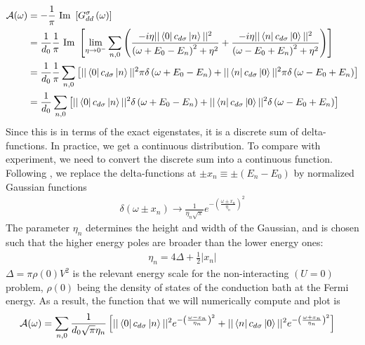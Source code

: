 \documentclass[twoside,11pt]{report}
\numberwithin{equation}{section}
\begin{document}
\begin{equation}\begin{aligned}
	\mathcal{A(\omega)} &= -\frac{1}{\pi}\text{ Im }\left[G_{dd}^\sigma\left( \omega \right) \right] \\
			    &= \frac{1}{d_0}\frac{1}{\pi}\text{ Im }\left[\lim_{\eta \to 0^-}\sum_{n,0}\left(\frac{-i\eta ||\bra{0}c_{d\sigma}\ket{n}||^2}{\left(\omega + E_0 - E_n\right)^2 + \eta^2} + \frac{-i\eta ||\bra{n}c_{d\sigma}\ket{0}||^2}{\left(\omega - E_0 + E_n\right)^2 + \eta^2}\right)\right]\\
			    &= \frac{1}{d_0}\frac{1}{\pi}\sum_{n,0}\left[||\bra{0}c_{d\sigma}\ket{n}||^2\pi\delta\left(\omega + E_0 - E_n\right) + ||\bra{n}c_{d\sigma}\ket{0}||^2\pi\delta\left(\omega - E_0 + E_n\right)\right]\\
			    &= \frac{1}{d_0}\sum_{n,0}\left[||\bra{0}c_{d\sigma}\ket{n}||^2\delta\left(\omega + E_0 - E_n\right) + ||\bra{n}c_{d\sigma}\ket{0}||^2\delta\left(\omega - E_0 + E_n\right)\right]\\
\end{aligned}\end{equation}
Since this is in terms of the exact eigenstates, it is a discrete sum of delta-functions. In practice, we get a continuous distribution. To compare with experiment, we need to convert the discrete sum into a continuous function. Following \cite{bulla_costi_nrg}, we replace the delta-functions at \(\pm x_n \equiv \pm(E_n - E_0)\) by normalized Gaussian functions
\begin{equation}\begin{aligned}
	\delta(\omega \pm x_n) \to \frac{1}{\eta_n\sqrt \pi}e^{-\left(\frac{\omega \pm x_n}{\eta_n}\right)^2}
\end{aligned}\end{equation}
The parameter \(\eta_n\) determines the height and width of the Gaussian, and is chosen such that the higher energy poles are broader than the lower energy ones:
\begin{equation}\begin{aligned}
	\eta_n = 4\Delta + \frac{1}{2}|x_n| 
\end{aligned}\end{equation}
\(\Delta = \pi \rho(0)V^2\) is the relevant energy scale for the non-interacting \((U=0)\) problem, \(\rho(0)\) being the density of states of the conduction bath at the Fermi energy. As a result, the function that we will numerically compute and plot is
\begin{equation}\begin{aligned}
	\mathcal{A(\omega)} &= \sum_{n,0}\frac{1}{d_0 \sqrt \pi \eta_n}\left[||\bra{0}c_{d\sigma}\ket{n}||^2e^{-\left(\frac{\omega - x_n}{\eta_n}\right)^2} + ||\bra{n}c_{d\sigma}\ket{0}||^2e^{-\left(\frac{\omega + x_n}{\eta_n}\right)^2}\right]
\end{aligned}\end{equation}
\end{document}
